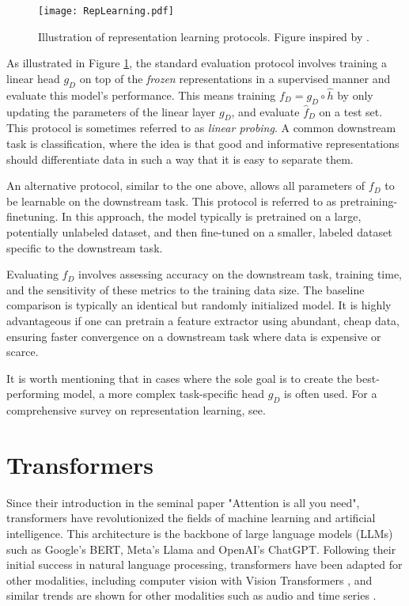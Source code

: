 \documentclass[../../thesis.tex]{subfiles}
\begin{document}
\begin{figure}[h]
    \texttt{[image: RepLearning.pdf]}
    \centering    
    \caption{Illustration of representation learning protocols. Figure inspired by \cite{nozawa2022empirical}.}
    \label{fig:rep_protocol}
\end{figure}


As illustrated in Figure \ref{fig:rep_protocol}, the standard evaluation protocol involves training a linear head $g_D$ on top of the \textit{frozen} representations in a supervised manner and evaluate this model's performance. This means training $f_D = g_D\circ \widehat{h}$ by only updating the parameters of the linear layer $g_D$, and evaluate $\widehat{f}_D$ on a test set. This protocol is sometimes referred to as \textit{linear probing}. A common downstream task is classification, where the idea is that good and informative representations should differentiate data in such a way that it is easy to separate them. \newline

An alternative protocol, similar to the one above, allows all parameters of $f_D$ to be learnable on the downstream task. This protocol is referred to as pretraining-finetuning. In this approach, the model typically is pretrained on a large, potentially unlabeled dataset, and then fine-tuned on a smaller, labeled dataset specific to the downstream task. \newline

Evaluating $f_D$ involves assessing accuracy on the downstream task, training time, and the sensitivity of these metrics to the training data size. The baseline comparison is typically an identical but randomly initialized model. It is highly advantageous if one can pretrain a feature extractor using abundant, cheap data, ensuring faster convergence on a downstream task where data is expensive or scarce.\newline

It is worth mentioning that in cases where the sole goal is to create the best-performing model, a more complex task-specific head $g_D$ is often used. For a comprehensive survey on representation learning, see\cite{nozawa2022empirical}.



\section{Transformers}

Since their introduction in the seminal paper "Attention is all you need"\cite{vaswani2023attention}, transformers have revolutionized the fields of machine learning and artificial intelligence. This architecture is the backbone of large language models (LLMs) such as Google's BERT, Meta's Llama and OpenAI's ChatGPT. Following their initial success in natural language processing, transformers have been adapted for other modalities, including computer vision with Vision Transformers \cite{dosovitskiy2021image}, and similar trends are shown for other modalities such as audio \cite{latif2023transformers} and time series \cite{wen2023transformers}. \newline
\end{document}
